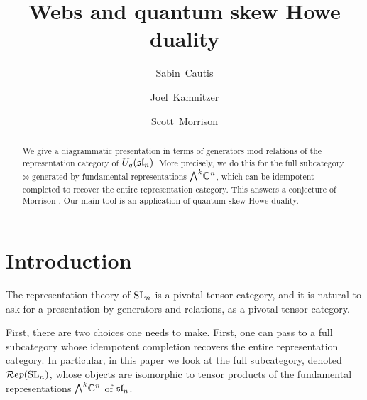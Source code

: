 \documentclass[11pt]{amsart}
\title{Webs and quantum skew Howe duality}
\author{Sabin~Cautis}
\author{Joel~Kamnitzer}
\author{Scott~Morrison}
\begin{document}
\makeatletter
{}
\gdef\theequation{\thesection.\arabic{equation}}
\makeatother

\begin{abstract}
We give a diagrammatic presentation in terms of generators mod relations of the representation category of $U_q(\sl_n) $. More precisely, we do this for the full subcategory $\otimes$-generated by fundamental representations $\Alt{k}{} \mathbb C^n$, which can be idempotent completed to recover the entire representation category. This answers a conjecture of Morrison \cite{0704.1503}. Our main tool is an application of quantum skew Howe duality. 
\end{abstract}

\maketitle


\tableofcontents






\section{Introduction}

The representation theory of $\SL_n$ is a pivotal tensor category, and it is natural to ask for a presentation by generators and relations, as a pivotal tensor category.

First, there are two choices one needs to make. First, one can pass to a full subcategory whose idempotent completion recovers the entire representation category. In particular, in this paper we look at the full subcategory, denoted $\Rep(\SL_n)$, whose objects are isomorphic to tensor products of the fundamental representations $\Alt{k}{} \mathbb C^n$ of $\sl_n$. 
\end{document}
